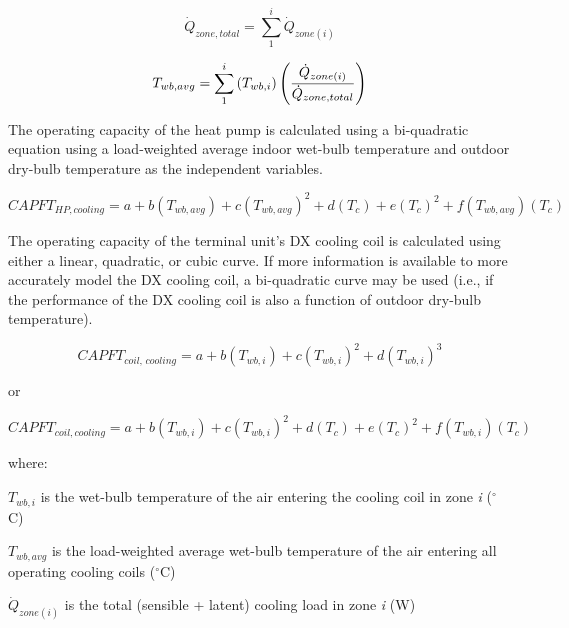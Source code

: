 \begin{equation}
{\dot{Q}_{zone,total}} = \sum\limits_1^i {\dot{Q}_{zone(i)}}
\end{equation}

\begin{equation}
  T_{wb,avg} = \sum\limits_1^i {\left(T_{wb,i}\right)} \left(\frac{\dot{Q}_{zone(i)}}{\dot{Q}_{zone,total}}\right)
\end{equation}

The operating capacity of the heat pump is calculated using a bi-quadratic equation using a load-weighted average indoor wet-bulb temperature and outdoor dry-bulb temperature as the independent variables.

\begin{equation}
CAPF{T_{HP,cooling}} = a + b\left( {{T_{wb,avg}}} \right) + c{\left( {{T_{wb,avg}}} \right)^2} + d\left( {{T_c}} \right) + e{\left( {{T_c}} \right)^2} + f\left( {{T_{wb,avg}}} \right)\left( {{T_c}} \right)
\end{equation}

The operating capacity of the terminal unit's DX cooling coil is calculated using either a linear, quadratic, or cubic curve. If more information is available to more accurately model the DX cooling coil, a bi-quadratic curve may be used (i.e., if the performance of the DX cooling coil is also a function of outdoor dry-bulb temperature).

\begin{equation}
CAPF{T_{coil,\,cooling}} = a + b\left( {{T_{wb,i}}} \right) + c{\left( {{T_{wb,i}}} \right)^2} + d{\left( {{T_{wb,i}}} \right)^3}
\end{equation}

or

\begin{equation}
CAPF{T_{coil,cooling}} = a + b\left( {{T_{wb,i}}} \right) + c{\left( {{T_{wb,i}}} \right)^2} + d\left( {{T_c}} \right) + e{\left( {{T_c}} \right)^2} + f\left( {{T_{wb,i}}} \right)\left( {{T_c}} \right)
\end{equation}

where:

\({T_{wb,i}}\) is the wet-bulb temperature of the air entering the cooling coil in zone \emph{i} (\(^{\circ}\)C)

\({T_{wb,avg}}\) is the load-weighted average wet-bulb temperature of the air entering all operating cooling coils (\(^{\circ}\)C)

\({\dot{Q}_{zone(i)}}\) is the total (sensible + latent) cooling load in zone \emph{i} (W)

